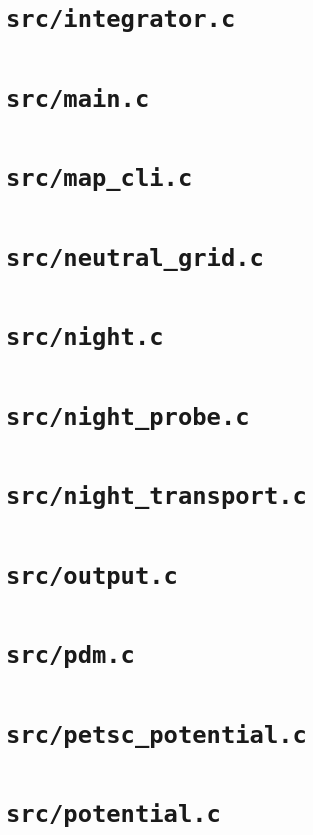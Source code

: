 \documentclass[9pt,a4paper]{extarticle}
\begin{document}
\section{\texttt{src/integrator.c}}

\clearpage
\section{\texttt{src/main.c}}

\clearpage
\section{\texttt{src/map\_cli.c}}

\clearpage
\section{\texttt{src/neutral\_grid.c}}

\clearpage
\section{\texttt{src/night.c}}

\clearpage
\section{\texttt{src/night\_probe.c}}

\clearpage
\section{\texttt{src/night\_transport.c}}

\clearpage
\section{\texttt{src/output.c}}

\clearpage
\section{\texttt{src/pdm.c}}

\clearpage
\section{\texttt{src/petsc\_potential.c}}

\clearpage
\section{\texttt{src/potential.c}}

\clearpage
\end{document}
